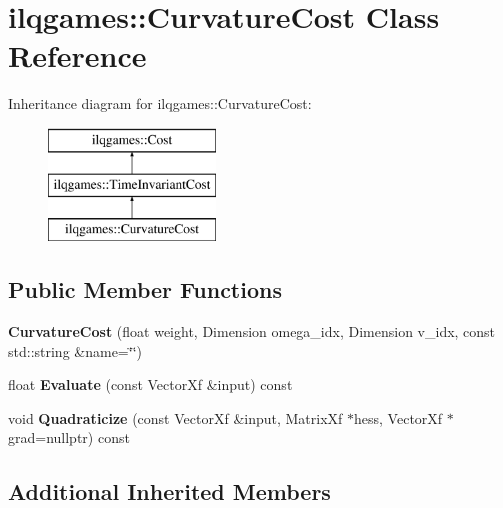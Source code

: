 \hypertarget{classilqgames_1_1_curvature_cost}{}\section{ilqgames\+:\+:Curvature\+Cost Class Reference}
\label{classilqgames_1_1_curvature_cost}
Inheritance diagram for ilqgames\+:\+:Curvature\+Cost\+:\begin{figure}[H]
\begin{center}
\leavevmode
\includegraphics[height=3.000000cm]{classilqgames_1_1_curvature_cost}
\end{center}
\end{figure}
\subsection*{Public Member Functions}
\begin{DoxyCompactItemize}
\item 
{\bfseries Curvature\+Cost} (float weight, Dimension omega\+\_\+idx, Dimension v\+\_\+idx, const std\+::string \&name=\char`\"{}\char`\"{})\hypertarget{classilqgames_1_1_curvature_cost_af3cef5c86cf6412de31496c1f7cc074a}{}\label{classilqgames_1_1_curvature_cost_af3cef5c86cf6412de31496c1f7cc074a}

\item 
float {\bfseries Evaluate} (const Vector\+Xf \&input) const \hypertarget{classilqgames_1_1_curvature_cost_a112ce04ef70a60c83d80a3de01108248}{}\label{classilqgames_1_1_curvature_cost_a112ce04ef70a60c83d80a3de01108248}

\item 
void {\bfseries Quadraticize} (const Vector\+Xf \&input, Matrix\+Xf $\ast$hess, Vector\+Xf $\ast$grad=nullptr) const \hypertarget{classilqgames_1_1_curvature_cost_a561db26a80f5d2578166751f28d9773f}{}\label{classilqgames_1_1_curvature_cost_a561db26a80f5d2578166751f28d9773f}

\end{DoxyCompactItemize}
\subsection*{Additional Inherited Members}


